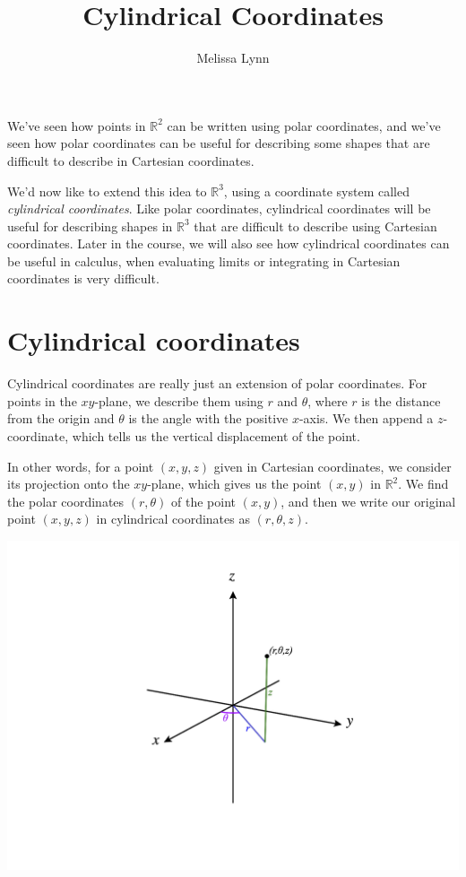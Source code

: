 \documentclass{ximera}
\title{Cylindrical Coordinates}
\author{Melissa Lynn}
\begin{document}
\begin{abstract}
\end{abstract}
\maketitle

We've seen how points in $\mathbb{R}^2$ can be written using polar coordinates, and we've seen how polar coordinates can be useful for describing some shapes that are difficult to describe in Cartesian coordinates.

We'd now like to extend this idea to $\mathbb{R}^3$, using a coordinate system called \emph{cylindrical coordinates}. Like polar coordinates, cylindrical coordinates will be useful for describing shapes in $\mathbb{R}^3$ that are difficult to describe using Cartesian coordinates. Later in the course, we will also see how cylindrical coordinates can be useful in calculus, when evaluating limits or integrating in Cartesian coordinates is very difficult.

\section*{Cylindrical coordinates}

Cylindrical coordinates are really just an extension of polar coordinates. For points in the $xy$-plane, we describe them using $r$ and $\theta$, where $r$ is the distance from the origin and $\theta$ is the angle with the positive $x$-axis. We then append a $z$-coordinate, which tells us the vertical displacement of the point.

In other words, for a point $(x,y,z)$ given in Cartesian coordinates, we consider its projection onto the $xy$-plane, which gives us the point $(x,y)$ in $\mathbb{R}^2$. We find the polar coordinates $(r,\theta)$ of the point $(x,y)$, and then we write our original point $(x,y,z)$ in cylindrical coordinates as $(r,\theta, z)$.

\begin{image}
\includegraphics[width = \textwidth]{CalcPlot3D-cylindrical}
\end{image}
\end{document}
